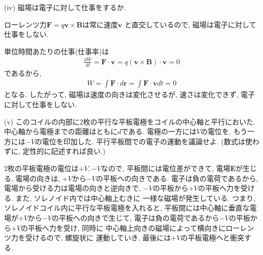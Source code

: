 \documentclass[a4paper,12pt]{jlreq}
\begin{document}
\vspace{10mm}

\vspace{100mm}

\begin{itembox}[l]{(iv)}
  磁場は電子に対して仕事をするか.
\end{itembox}


\par

ローレンツ力$\bm{F} = q\bm{v} \times \bm{B}$は常に速度$\bm{v}$
と直交しているので, 磁場は電子に対して仕事をしない. 

単位時間あたりの仕事(仕事率)は
\begin{align}
  \frac {dW}{dt} = \bm{F} \cdot \bm{v} = q(\bm{v} \times \bm{B}) \cdot \bm{v} = 0
\end{align}
であるから, 
\begin{align}
  W = \int \bm{F} \cdot d\bm{r} = \int \bm{F} \cdot \bm{v} dt = 0
\end{align}
となる. したがって, 磁場は速度の向きは変化させるが, 速さは変化できず, 
電子に対して仕事をしない. 



\vspace{10mm}


\begin{itembox}[l]{(v)}
  このコイルの内部に2枚の平行な平板電極をコイルの中心軸と平行においた. 
中心軸から電極までの距離はともに$d$である. 電極の一方には$V$の電位を, 
もう一方には$-V$の電位を印加した. 平行平板間での電子の運動を議論せよ.
(数式は使わずに, 定性的に記述すれば良い.)
\end{itembox}

\par
2枚の平板電極の電位は$+V,-V$なので, 平板間には電位差ができて, 
電場$\bm{E}$が生じる. 電場の向きは, $+V$から$-V$の平板への向きである. 
電子は負の電荷であるから, 電場から受ける力は電場の向きと逆向きで, 
$-V$の平板から$+V$の平板へ力を受ける. また, ソレノイド内では中心軸上むきに
一様な磁場が発生している. 
つまり, ソレノイドコイル内に平行な平板電極を入れると, 
平板間には中心軸に垂直な電場が$+V$から$-V$の平板への向きで生じて, 
電子は負の電荷であるから$-V$の平板から$+V$の平板へ力を受け, 同時に
中心軸上向きの磁場によって横向きにローレンツ力を受けるので, 螺旋状に
運動していき, 最後には$+V$の平板電極へと衝突する. 
\end{document}
